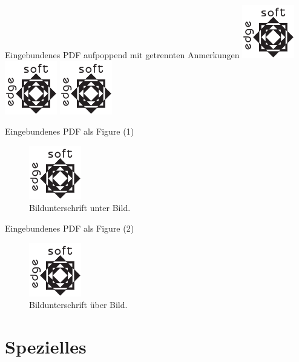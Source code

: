 	\begin{frame}{Eingebundenes PDF aufpoppend mit getrennten Anmerkungen}
		\includegraphics<1->{testlogo}
		\includegraphics<2->{testlogo}
		\includegraphics<3->{testlogo}
	\end{frame}


	\begin{frame}{Eingebundenes PDF als Figure (1)}
		\begin{figure}
			\includegraphics{testlogo}
			\caption{Bildunterschrift unter Bild.}
		\end{figure}
	\end{frame}


	\begin{frame}{Eingebundenes PDF als Figure (2)}
		\begin{figure}
			\caption{Bildunterschrift über Bild.}
			\includegraphics{testlogo}
		\end{figure}
	\end{frame}


	\section{Spezielles}

